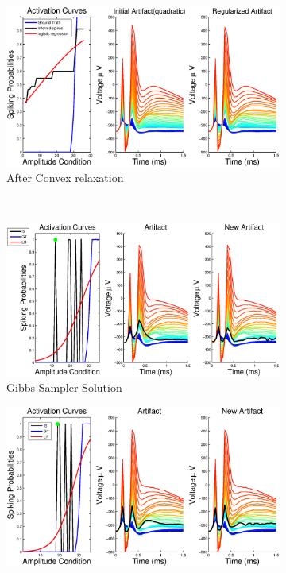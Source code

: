 \documentclass[12pt,letterpaper,fleqn]{article}
\begin{document}
\begin{figure}[ht!]
        \centering
        \begin{subfigure}[b]{0.5\textwidth}
                \includegraphics[width=\textwidth]{i0.eps}
                \caption{After Convex relaxation}
        \end{subfigure}%
~\begin{subfigure}[b]{0.5\textwidth}
                \includegraphics[width=\textwidth]{i1.eps}
                \caption{Gibbs Sampler Solution}
        \end{subfigure}
        \begin{subfigure}[b]{0.5\textwidth}
                \includegraphics[width=\textwidth]{i2.eps}

\end{subfigure}
\end{figure}
\end{document}
